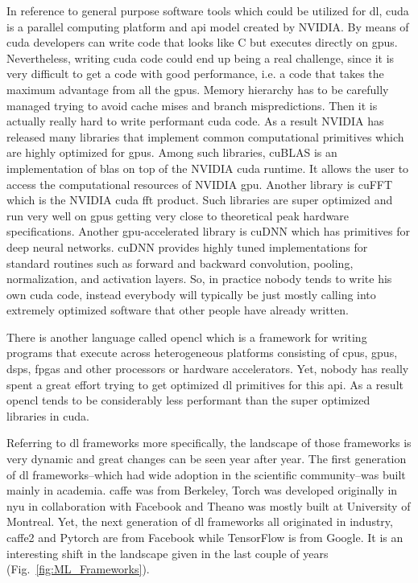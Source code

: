 \documentclass[11pt,a4paper]{article}
\begin{document}
In reference to general purpose software tools which could be utilized for \gls{dl}, \gls{cuda} is a parallel computing platform and \gls{api} model created by NVIDIA. By means of \gls{cuda} developers can write code that looks like C but executes directly on \glspl{gpu}. Nevertheless,  writing \gls{cuda} code could end up being a real challenge, since it is very difficult to get a code with good performance, i.e. a code that takes the maximum advantage from all the \glspl{gpu}. Memory hierarchy has to be carefully managed trying to avoid cache mises and branch mispredictions. Then it is actually really hard to write performant \gls{cuda} code. As a result NVIDIA has released many libraries that implement common computational primitives which are highly optimized for \glspl{gpu}. Among such libraries, cuBLAS is an implementation of \gls{blas} on top of the NVIDIA \gls{cuda} runtime. It allows the user to access the computational resources of NVIDIA \gls{gpu}. Another library is cuFFT which is the NVIDIA \gls{cuda} \gls{fft} product. Such libraries are super optimized and run very well on \glspl{gpu}  getting very close to theoretical peak hardware specifications. Another \gls{gpu}-accelerated library is cuDNN which has primitives for deep neural networks. cuDNN provides highly tuned implementations for standard routines such as forward and backward convolution, pooling, normalization, and activation layers. So, in practice nobody tends to write his own \gls{cuda} code, instead everybody will typically be just mostly calling into extremely optimized software that other people have already written.

There is another language called \gls{opencl} which is a framework for writing programs that execute across heterogeneous platforms consisting of \glspl{cpu}, \glspl{gpu}, \glspl{dsp},  \glspl{fpga} and other processors or hardware accelerators. Yet, nobody has really spent a great effort trying to get optimized \gls{dl} primitives for this \gls{api}. As a result \gls{opencl} tends to be considerably less performant than the super optimized libraries in \gls{cuda}.

Referring to \gls{dl} frameworks more specifically, the landscape of those frameworks is very dynamic and great changes can be seen year after year. The first generation of \gls{dl} frameworks--which had wide adoption in the scientific community--was built mainly in academia. \gls{caffe} was from Berkeley, Torch was developed originally in \gls{nyu} in collaboration with Facebook and Theano was mostly built at University of Montreal. Yet, the next generation of \gls{dl} frameworks all originated in industry, \gls{caffe}2 and Pytorch are from Facebook while TensorFlow is from Google. It is an interesting shift in the landscape given in the last couple of years (Fig.~\ref{fig:ML_Frameworks}).
\end{document}
